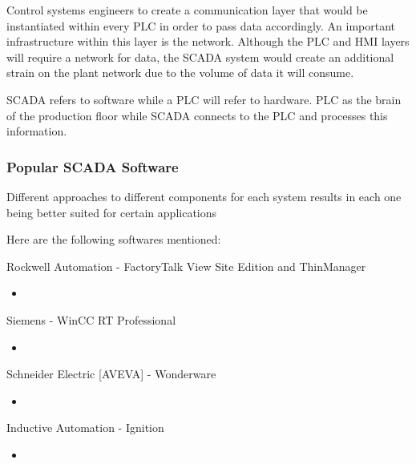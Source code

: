 Control systems engineers to create a communication layer that would be instantiated within every PLC in order to pass data accordingly. An important infrastructure within this layer is the network. Although the PLC and HMI layers will require a network for data, the SCADA system would create an additional strain on the plant network due to the volume of data it will consume.
\begin{concept}
    SCADA refers to software while a PLC will refer to hardware. PLC as the brain of the production floor while SCADA connects to the PLC and processes this information.
\end{concept}

\subsubsection{Popular SCADA Software}
Different approaches to different components for each system results in each one being better suited for certain applications

Here are the following softwares mentioned:

Rockwell Automation - FactoryTalk View Site Edition and ThinManager
\begin{itemize}
    \item 
\end{itemize}

Siemens - WinCC RT Professional
\begin{itemize}
    \item 
\end{itemize}

Schneider Electric [AVEVA] - Wonderware
\begin{itemize}
    \item 
\end{itemize}

Inductive Automation - Ignition
\begin{itemize}
    \item 
\end{itemize}
